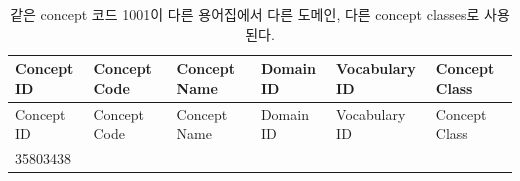 \documentclass[11pt]{book}
\theoremstyle{definition}
\theoremstyle{definition}
\theoremstyle{definition}
\theoremstyle{remark}
\begin{document}
\begin{longtable}[]{@{}llllll@{}}
\caption{\label{tab:code1001} 같은 concept 코드 1001이 다른 용어집에서 다른
도메인, 다른 concept classes로 사용된다.}\tabularnewline
\toprule
\begin{minipage}[b]{0.13\columnwidth}\raggedright\strut
Concept ID\strut
\end{minipage} & \begin{minipage}[b]{0.07\columnwidth}\raggedright\strut
Concept Code\strut
\end{minipage} & \begin{minipage}[b]{0.16\columnwidth}\raggedright\strut
Concept Name\strut
\end{minipage} & \begin{minipage}[b]{0.14\columnwidth}\raggedright\strut
Domain ID\strut
\end{minipage} & \begin{minipage}[b]{0.14\columnwidth}\raggedright\strut
Vocabulary ID\strut
\end{minipage} & \begin{minipage}[b]{0.14\columnwidth}\raggedright\strut
Concept Class\strut
\end{minipage}\tabularnewline
\midrule
\endfirsthead
\toprule
\begin{minipage}[b]{0.13\columnwidth}\raggedright\strut
Concept ID\strut
\end{minipage} & \begin{minipage}[b]{0.07\columnwidth}\raggedright\strut
Concept Code\strut
\end{minipage} & \begin{minipage}[b]{0.16\columnwidth}\raggedright\strut
Concept Name\strut
\end{minipage} & \begin{minipage}[b]{0.14\columnwidth}\raggedright\strut
Domain ID\strut
\end{minipage} & \begin{minipage}[b]{0.14\columnwidth}\raggedright\strut
Vocabulary ID\strut
\end{minipage} & \begin{minipage}[b]{0.14\columnwidth}\raggedright\strut
Concept Class\strut
\end{minipage}\tabularnewline
\midrule
\endhead
\begin{minipage}[t]{0.13\columnwidth}\raggedright\strut
35803438\strut
\end{minipage} & \begin{minipage}[t]{0.07\columnwidth}\raggedright\strut

\end{minipage}
\end{longtable}
\end{document}
